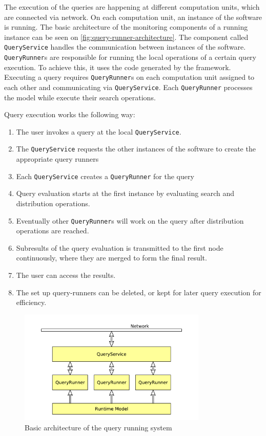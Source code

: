 The execution of the queries are happening at different computation units, which are connected via network.
On each computation unit, an instance of the software is running.
The basic architecture of the monitoring components of a running instance can be seen on \autoref{fig:query-runner-architecture}. 
The component called \texttt{QueryService} handles the communication between instances of the software.
\texttt{QueryRunner}s are responsible for running the local operations of a certain query execution. 
To achieve this, it uses the code generated by the framework.
Executing a query requires \texttt{QueryRunner}s on each computation unit assigned to each other and communicating via \texttt{QueryService}. 
Each \texttt{QueryRunner} processes the model while execute their search operations.

Query execution works the following way:
\begin{enumerate}
\item The user invokes a query at the local \texttt{QueryService}.
\item The \texttt{QueryService} requests the other instances of the software to create the appropriate query runners
\item Each \texttt{QueryService} creates a \texttt{QueryRunner} for the query
\item Query evaluation starts at the first instance by evaluating search and distribution operations.
\item Eventually other \texttt{QueryRunner}s will work on the query after distribution operations are reached.
\item Subresults of the query evaluation is transmitted to the first node continuously, where they are merged to form the final result.
\item The user can access the results.
\item The set up query-runners can be deleted, or kept for later query execution for efficiency.
\end{enumerate}


\begin{figure}[H]
	\begin{center}
		\includegraphics[width=0.8\textwidth]{figures/query-runner-architecture.pdf}
		\caption{ Basic architecture of the query running system }
		\label{fig:query-runner-architecture}
	\end{center}
\end{figure}









